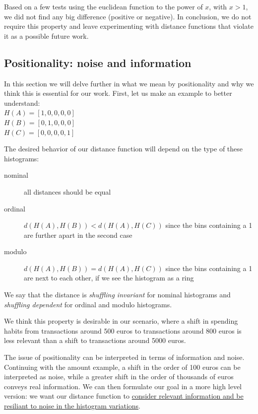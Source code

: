 Based on a few tests using the euclidean function to the power of $x$, with $x > 1$, we did not find any big difference (positive or negative). In conclusion, we do not require this property and leave experimenting with distance functions that violate it as a possible future work.

\subsection{Positionality: noise and information}

In this section we will delve further in what we mean by positionality and why we think this is essential for our work.
First, let us make an example to better understand:\\
$H(A) = [1, 0, 0, 0, 0]$\\
$H(B) = [0, 1, 0, 0, 0]$\\
$H(C) = [0, 0, 0, 0, 1]$

The desired behavior of our distance function will depend on the type of these histograms:
\begin{description}
  \item[nominal] all distances should be equal
  \item[ordinal] $d(H(A), H(B)) < d(H(A), H(C))$ since the bins containing a 1 are further apart in the second case
  \item[modulo] $d(H(A), H(B)) = d(H(A), H(C))$ since the bins containing a 1 are next to each other, if we see the histogram as a ring
\end{description}

We say that the distance is \textit{shuffling invariant} for nominal histograms and \textit{shuffling dependent} for ordinal and modulo histograms.

We think this property is desirable in our scenario, where a shift in spending habits from transactions around 500 euros to transactions around 800 euros is less relevant than a shift to transactions around 5000 euros.

The issue of positionality can be interpreted in terms of information and noise. Continuing with the amount example, a shift in the order of 100 euros can be interpreted as noise, while a greater shift in the order of thousands of euros conveys real information. We can then formulate our goal in a more high level version: we want our distance function to \underline{consider relevant information and be resiliant to noise in the histogram variations}.

